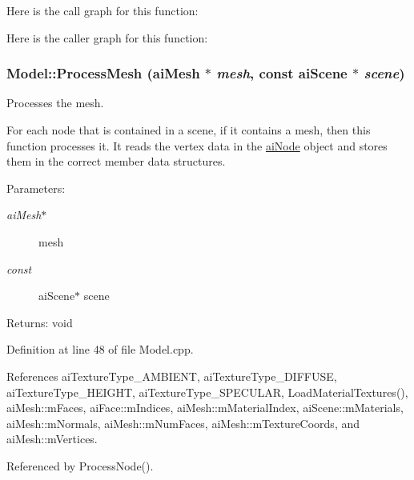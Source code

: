 Here is the call graph for this function:

Here is the caller graph for this function:\hypertarget{class_model_2cc9f43dc71e2781369f6106392e560e}{
\subsubsection[ProcessMesh]{ Model::ProcessMesh ({\bf aiMesh} $\ast$ {\em mesh}, \/  const {\bf aiScene} $\ast$ {\em scene})}}
\label{class_model_2cc9f43dc71e2781369f6106392e560e}


Processes the mesh. 

For each node that is contained in a scene, if it contains a mesh, then this function processes it. It reads the vertex data in the \hyperlink{structai_node}{aiNode} object and stores them in the correct member data structures.

\begin{Desc}
\item[Parameters:]
\begin{description}
\item[{\em aiMesh$\ast$}]mesh \item[{\em const}]aiScene$\ast$ scene \end{description}
\end{Desc}
\begin{Desc}
\item[Returns:]void \end{Desc}


Definition at line 48 of file Model.cpp.

References aiTextureType\_\-AMBIENT, aiTextureType\_\-DIFFUSE, aiTextureType\_\-HEIGHT, aiTextureType\_\-SPECULAR, LoadMaterialTextures(), aiMesh::mFaces, aiFace::mIndices, aiMesh::mMaterialIndex, aiScene::mMaterials, aiMesh::mNormals, aiMesh::mNumFaces, aiMesh::mTextureCoords, and aiMesh::mVertices.

Referenced by ProcessNode().

